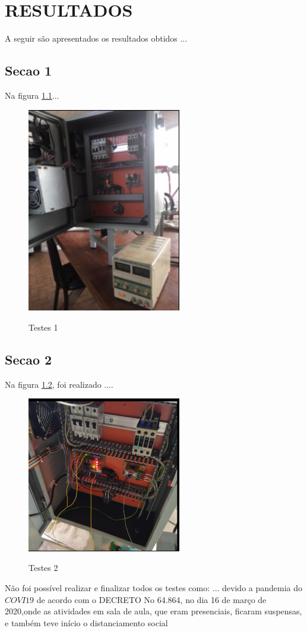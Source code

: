 
\chapter{RESULTADOS}

A seguir são apresentados os resultados obtidos ...

\section{Secao 1}
\label{sec:Secao_1}
Na figura \ref{fig:figura50}...

\begin{figure}[H]
    \centering
    \caption{Testes 1}
    \includegraphics[width=0.6\textwidth]{figuras/figu50.png}
    \label{fig:figura50}
\end{figure}

\section{Secao 2}
\label{sec:Secao_2}

Na figura \ref{fig:figura44}, foi realizado ....

\begin{figure}[H]
    \centering
    \caption{Testes 2}
    \includegraphics[width=0.6\textwidth]{figuras/figu44.png}
    \label{fig:figura44}
\end{figure}

Não foi possível realizar e finalizar todos os testes como: ... devido a pandemia do $COVI19$ de acordo com o DECRETO No 64.864, no dia 16 de março de 2020,onde as atividades em sala de aula, que eram presenciais, ficaram suspensas, e também teve início o distanciamento social